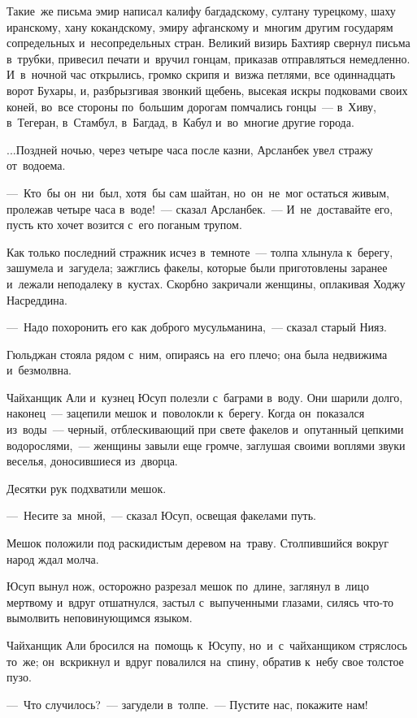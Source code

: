 \documentclass[12pt,a4paper]{book}
\begin{document}
Такие~же письма эмир написал калифу багдадскому, султану турецкому, шаху иранскому, хану кокандскому, эмиру афганскому и~многим другим государям сопредельных и~несопредельных стран. Великий визирь Бахтияр свернул письма в~трубки, привесил печати и~вручил гонцам, приказав отправляться немедленно. И~в~ночной час открылись, громко скрипя и~визжа петлями, все одиннадцать ворот Бухары, и, разбрызгивая звонкий щебень, высекая искры подковами своих коней, во~все стороны по~большим дорогам помчались гонцы~— в~Хиву, в~Тегеран, в~Стамбул, в~Багдад, в~Кабул и~во~многие другие города.

...Поздней ночью, через четыре часа после казни, Арсланбек увел стражу от~водоема.

—~Кто~бы он~ни~был, хотя~бы сам шайтан, но~он~не~мог остаться живым, пролежав четыре часа в~воде!~— сказал Арсланбек.~— И~не~доставайте его, пусть кто хочет возится с~его поганым трупом.

Как только последний стражник исчез в~темноте~— толпа хлынула к~берегу, зашумела и~загудела; зажглись факелы, которые были приготовлены заранее и~лежали неподалеку в~кустах. Скорбно закричали женщины, оплакивая Ходжу Насреддина.

—~Надо похоронить его как доброго мусульманина,~— сказал старый Нияз.

Гюльджан стояла рядом с~ним, опираясь на~его плечо; она была недвижима и~безмолвна.

Чайханщик Али и~кузнец Юсуп полезли с~баграми в~воду. Они шарили долго, наконец~— зацепили мешок и~поволокли к~берегу. Когда он~показался из~воды~— черный, отблескивающий при свете факелов и~опутанный цепкими водорослями,~— женщины завыли еще громче, заглушая своими воплями звуки веселья, доносившиеся из~дворца.

Десятки рук подхватили мешок.

—~Несите за~мной,~— сказал Юсуп, освещая факелами путь.

Мешок положили под раскидистым деревом на~траву. Столпившийся вокруг народ ждал молча.

Юсуп вынул нож, осторожно разрезал мешок по~длине, заглянул в~лицо мертвому и~вдруг отшатнулся, застыл с~выпученными глазами, силясь что-то вымолвить неповинующимся языком.

Чайханщик Али бросился на~помощь к~Юсупу, но~и~с~чайханщиком стряслось то~же; он~вскрикнул и~вдруг повалился на~спину, обратив к~небу свое толстое пузо.

—~Что случилось?~— загудели в~толпе.~— Пустите нас, покажите нам!
\end{document}
